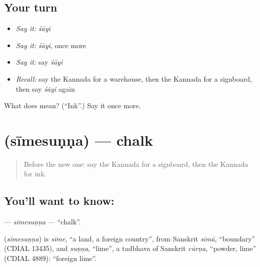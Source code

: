 \subsection*{Your turn}
\begin{itemize}
\raggedright
  \item \emph{Say it:} \emph{śāyi}
  \item \emph{Say it:} \emph{śāyi}, once more
  \item \emph{Say it:} say \emph{śāyi}
  \item \emph{Recall:} say the Kannada for a warehouse, then the Kannada for a signboard, then say \emph{śāyi} again
\end{itemize}

\begin{tcolorbox}[breakable,colback=teal!4,colframe=teal!35!black,title={Before you move on}]
What does  mean? (\textquotedblleft{}Ink\textquotedblright{}.) Say it once more.
\end{tcolorbox}
\section[\texorpdfstring{\kn{ಸೀಮೆಸುಣ್ಣ} (sīmesuṇṇa)}{ಸೀಮೆಸುಣ್ಣ (sīmesuṇṇa)}]{ (sīmesuṇṇa) — chalk}

\label{lesson:KA-C307-simesunna}



\begin{quote}
Before the new one: say the Kannada for a signboard, then the Kannada for ink.
\end{quote}

\subsection*{You'll want to know: }
\textbf{} — \emph{sīmesuṇṇa} — \textquotedblleft{}chalk\textquotedblright{}.

\begin{cousinweb}
\textbf{} (\emph{sīmesuṇṇa}) is \emph{sīme}, \textquotedblleft{}a land, a foreign country\textquotedblright{}, from Sanskrit \emph{sīmā}, \textquotedblleft{}boundary\textquotedblright{} (CDIAL 13435), and \emph{suṇṇa}, \textquotedblleft{}lime\textquotedblright{}, a tadbhava of Sanskrit \emph{cūrṇa}, \textquotedblleft{}powder, lime\textquotedblright{} (CDIAL 4889): \textquotedblleft{}foreign lime\textquotedblright{}.
\end{cousinweb}

